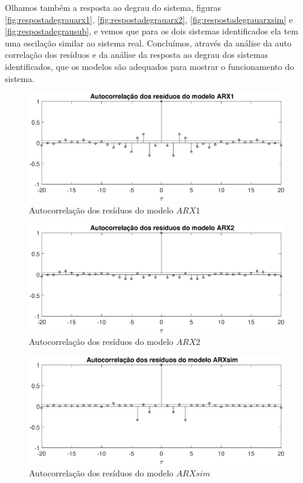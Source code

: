 Olhamos também a resposta ao degrau do sistema, figuras \ref{fig:respostadegrauarx1}, \ref{fig:respostadegrauarx2}, \ref{fig:respostadegrauarxsim} e  \ref{fig:respostadegrausub}, e vemos que para os dois sistemas identificados ela tem uma oscilação similar ao sistema real. Concluímos, através da análise da auto correlação dos resíduos e da análise da resposta ao degrau dos sistemas identificados, que os modelos são adequados para mostrar o funcionamento do sistema.

\begin{figure}[H]
	\centering
	\includegraphics[width=1\linewidth]{autocorrelacaoARX1}
	\caption[Autocorrelação dos resíduos do modelo $ARX1$]{Autocorrelação dos resíduos do modelo $ARX1$}
	\label{fig:autocorrelacaoARX1}
\end{figure}

\begin{figure}[H]
	\centering
	\includegraphics[width=1\linewidth]{autocorrelacaoARX2}
	\caption[Autocorrelação dos resíduos do modelo $ARX2$]{Autocorrelação dos resíduos do modelo $ARX2$}
	\label{fig:autocorrelacaoARX2}
\end{figure}

\begin{figure}[H]
	\centering
	\includegraphics[width=1\linewidth]{autocorrelacaoARXsim}
	\caption[Autocorrelação dos resíduos do modelo $ARXsim$]{Autocorrelação dos resíduos do modelo $ARXsim$}
	\label{fig:autocorrelacaoarxsim}
\end{figure}

